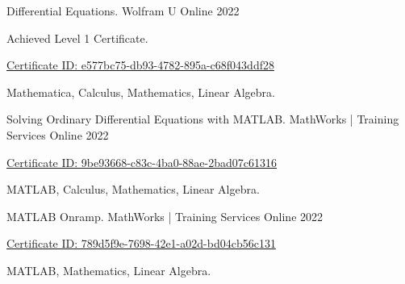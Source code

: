 

\begin{cventries}
	
	\cventry
	{Differential Equations.} %
	{Wolfram U} %
	{Online} %
	{2022} %
	{
		\begin{cvitems} %
			\item {Achieved Level 1 Certificate.}
			\item {\href{https://www.wolframcloud.com/obj/online-courses/certificates/introduction-to-differential-equations/e577bc75-db93-4782-895a-c68f043ddf28/1.html}{Certificate ID: e577bc75-db93-4782-895a-c68f043ddf28}}
			\item { Mathematica, Calculus, Mathematics, Linear Algebra.}
		\end{cvitems}
	}
	
	
	\cventry
	{Solving Ordinary Differential Equations with MATLAB.} %
	{MathWorks | Training Services} %
	{Online} %
	{2022} %
	{
		\begin{cvitems} %
			\item {\href{https://matlabacademy.mathworks.com/progress/share/certificate.html?id=9be93668-c83c-4ba0-88ae-2bad07c61316\&/}{Certificate ID: 9be93668-c83c-4ba0-88ae-2bad07c61316}}
			\item { MATLAB, Calculus, Mathematics, Linear Algebra.}
		\end{cvitems}
	}
	
	
	\cventry
	{MATLAB Onramp.} %
	{MathWorks | Training Services} %
	{Online} %
	{2022} %
	{
		\begin{cvitems} %
			\item {\href{https://matlabacademy.mathworks.com/progress/share/certificate.html?id=8f96ee2e-ece0-4ddf-976e-3681e03ed250\&/}{Certificate ID: 789d5f9e-7698-42e1-a02d-bd04cb56c131}}
			\item { MATLAB, Mathematics, Linear Algebra.}
		\end{cvitems}
	}
	

\end{cventries}
